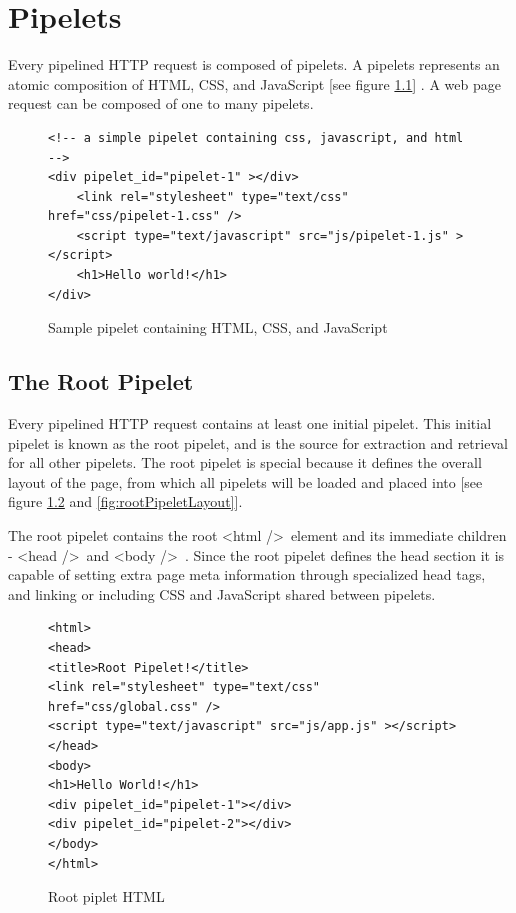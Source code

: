 \documentclass[12pt]{report}
\begin{document}
\chapter{Pipelets}

Every pipelined HTTP request is composed of pipelets. A pipelets represents an atomic composition of HTML, CSS, and JavaScript [see figure \ref{fig:samplePipelet}] . A web page request can be composed of one to many pipelets.

\begin{figure}[H]
\caption{Sample pipelet containing HTML, CSS, and JavaScript}
\label{fig:samplePipelet}
\begin{lstlisting}
<!-- a simple pipelet containing css, javascript, and html -->
<div pipelet_id="pipelet-1" ></div>
	<link rel="stylesheet" type="text/css" href="css/pipelet-1.css" />
	<script type="text/javascript" src="js/pipelet-1.js" ></script>
	<h1>Hello world!</h1>
</div>
\end{lstlisting}
\end{figure}


\section{The Root Pipelet}
Every pipelined HTTP request contains at least one initial pipelet. This initial pipelet is known as the root pipelet, and is the source for extraction and retrieval for all other pipelets. The root pipelet is special because it defines the overall layout of the page, from which all pipelets will be loaded and placed into [see figure \ref{fig:sampleRootPipelet} and \ref{fig:rootPipeletLayout}]. 
	
The root pipelet contains the root \textless html /\textgreater\ element and its immediate children - \textless head /\textgreater\ and \textless body /\textgreater\	. Since the root pipelet defines the head section it is capable of setting extra page meta information through specialized head tags, and linking or including CSS and JavaScript shared between pipelets.

\begin{figure}[H]
\caption{Root piplet HTML}
\label{fig:sampleRootPipelet}
\begin{lstlisting}
<html>
<head>
<title>Root Pipelet!</title>
<link rel="stylesheet" type="text/css" href="css/global.css" />
<script type="text/javascript" src="js/app.js" ></script>
</head>
<body>
<h1>Hello World!</h1>
<div pipelet_id="pipelet-1"></div>
<div pipelet_id="pipelet-2"></div>
</body>
</html>
\end{lstlisting}
\end{figure}
\end{document}
